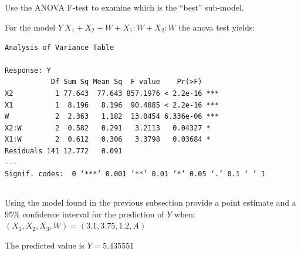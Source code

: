 \documentclass{article}
\begin{document}
\subsection{}
Use the ANOVA F-test to examine which is the ``best'' sub-model.

For the model $Y ~ X_1 + X_2 + W + X_1:W + X_2:W$ the anova test yields:
  \begin{lstlisting}
Analysis of Variance Table

Response: Y
           Df Sum Sq Mean Sq  F value    Pr(>F)    
X2          1 77.643  77.643 857.1976 < 2.2e-16 ***
X1          1  8.196   8.196  90.4885 < 2.2e-16 ***
W           2  2.363   1.182  13.0454 6.336e-06 ***
X2:W        2  0.582   0.291   3.2113   0.04327 *  
X1:W        2  0.612   0.306   3.3798   0.03684 *  
Residuals 141 12.772   0.091                       
---
Signif. codes:  0 ‘***’ 0.001 ‘**’ 0.01 ‘*’ 0.05 ‘.’ 0.1 ‘ ’ 1
  \end{lstlisting}

\subsection{}
Using the model found in the previous subsection provide a point estimate and a
$95\%$ confidence interval for the prediction of $Y$ when: $(X_1, X_2, X_3,
W)=(3.1,3.75,1.2,A)$

The predicted value is $Y = 5.435551$
\end{document}
